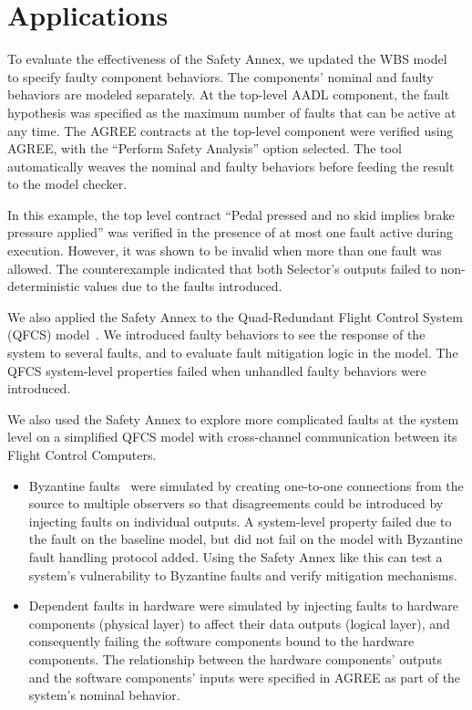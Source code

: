 \section{Applications}

To evaluate the effectiveness of the Safety Annex, we updated the WBS model~\cite{Stewart17:IMBSA} to specify faulty component behaviors. The components' nominal  and faulty behaviors are modeled separately. At the top-level AADL component, the fault hypothesis was specified as the maximum number of faults that can be active at any time. The AGREE contracts at the top-level component were verified using AGREE, with the ``Perform Safety Analysis'' option selected. The tool automatically weaves the nominal and faulty behaviors before feeding the result to the model checker.

In this example, the top level contract ``Pedal pressed and no skid implies brake pressure applied'' was verified in the presence of at most one fault active during execution.  However, it was shown to be invalid when more than one fault was allowed. The counterexample indicated that both Selector's outputs failed to non-deterministic values due to the faults introduced.

We also applied the Safety Annex to the Quad-Redundant Flight Control System (QFCS) model~\cite{QFCS15:backes}.  We introduced faulty behaviors to see the response of the system to several faults, and to evaluate fault mitigation logic in the model.  The QFCS system-level properties failed when unhandled faulty behaviors were introduced.

We also used the Safety Annex to explore more complicated faults at the system level on a simplified QFCS model with cross-channel communication between its Flight Control Computers.

\begin{itemize} 
	\item Byzantine faults~\cite{Driscoll-Byzantine-Fault} were simulated by creating one-to-one connections from the source to multiple observers so that disagreements could be introduced by injecting faults on individual outputs. A system-level property failed due to the fault on the baseline model, but did not fail on the model with Byzantine fault handling protocol added. Using the Safety Annex like this can test a system's vulnerability to Byzantine faults and verify mitigation mechanisms.
	
	\item Dependent faults in hardware were simulated by injecting faults to hardware components (physical layer) to affect their data outputs (logical layer), and consequently failing the software components bound to the hardware components. The relationship between the hardware components' outputs and the software components' inputs were specified in AGREE as part of the system's nominal behavior.	
\end{itemize}


















